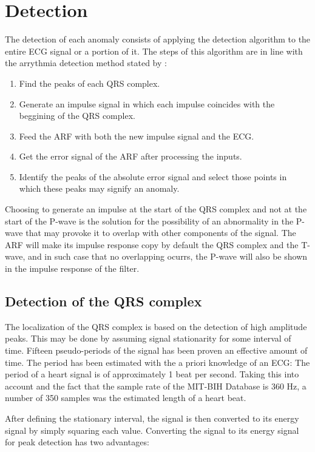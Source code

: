 \documentclass[conference]{IEEEtran}
\begin{document}
\section{Detection}

The detection of each anomaly consists of applying the detection algorithm to the entire ECG signal or a portion of it. The steps of this algorithm are in line with the arrythmia detection method stated by \cite{b1}:

\begin{enumerate}
\item Find the peaks of each QRS complex.
\item Generate an impulse signal in which each impulse coincides with the beggining of the QRS complex.  
\item Feed the ARF with both the new impulse signal and the ECG. 
\item Get the error signal of the ARF after processing the inputs.
\item Identify the peaks of the absolute error signal and select those points in which these peaks may signify an anomaly.
\end{enumerate}

Choosing to generate an impulse at the start of the QRS complex and not at the start of the P-wave is the solution for the possibility of an abnormality in the P-wave that may provoke it to overlap with other components of the signal. The ARF will make its impulse response copy by default the QRS complex and the T-wave, and in such case that no overlapping ocurrs, the P-wave will also be shown in the impulse response of the filter.

\subsection{Detection of the QRS complex}

The localization of the QRS complex is based on the detection of high amplitude peaks. This may be done by assuming signal stationarity for some interval of time. Fifteen pseudo-periods of the signal has been proven an effective amount of time. The period has been estimated with the a priori knowledge of an ECG: The period of a heart signal is of approximately 1 beat per second. Taking this into account and the fact that the sample rate of the MIT-BIH Database is 360 Hz, a number of 350 samples was the estimated length of a heart beat. \par
After defining the stationary interval, the signal is then converted to its energy signal by simply squaring each value. Converting the signal to its energy signal for peak detection has two advantages:
\end{document}
